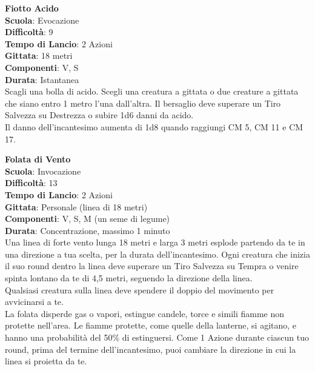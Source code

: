 \begin{multicols}{2}
\medskip\textbf{Fiotto Acido}\\
\textbf{Scuola}: Evocazione\\
\textbf{Difficoltà}:  9\\
\textbf{Tempo di Lancio}: 2 Azioni\\
\textbf{Gittata}: 18 metri\\
\textbf{Componenti}: V, S\\
\textbf{Durata}: Istantanea\\
Scagli una bolla di acido. Scegli una creatura a gittata o due creature a gittata che siano entro 1 metro l’una dall'altra. Il bersaglio deve superare un Tiro Salvezza su Destrezza o subire 1d6 danni da acido.\\
Il danno dell'incantesimo aumenta di 1d8 quando raggiungi CM 5, CM 11 e CM 17.

\medskip\textbf{Folata di Vento}\\
\textbf{Scuola}: Invocazione\\
\textbf{Difficoltà}:  13\\
\textbf{Tempo di Lancio}: 2 Azioni\\
\textbf{Gittata}: Personale (linea di 18 metri)\\
\textbf{Componenti}: V, S, M (un seme di legume)\\
\textbf{Durata}: Concentrazione, massimo 1 minuto\\
Una linea di forte vento lunga 18 metri e larga 3 metri esplode partendo da te in una direzione a tua scelta, per la durata dell'incantesimo. Ogni creatura che inizia il suo round dentro la linea deve superare un Tiro Salvezza su Tempra o venire spinta lontano da te di 4,5 metri, seguendo la direzione della linea.\\
Qualsiasi creatura sulla linea deve spendere il doppio del movimento per avvicinarsi a te.\\
La folata disperde gas o vapori, estingue candele, torce e simili fiamme non protette nell'area. Le fiamme protette, come quelle della lanterne, si agitano, e hanno una probabilità del 50\% di estinguersi. Come 1 Azione durante ciascun tuo round, prima del termine dell'incantesimo, puoi cambiare la direzione in cui la linea si proietta da te.


\end{multicols}
